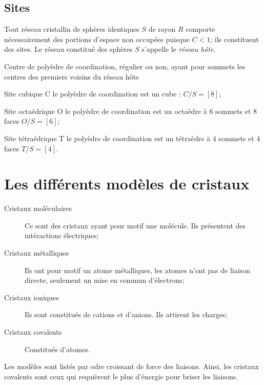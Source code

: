 \subsection{Sites}
Tout réseau cristallin de sphères identiques $S$ de rayon $R$ comporte
nécessairement des portions d'espace non occupées puisque $C < 1$; ils
constituent des sites. Le réseau constitué des sphères $S$ s'appelle le
\emph{réseau h\^ote}.
\begin{defi}
    Centre de polyèdre de coordination, régulier ou non, ayant pour sommets
    les centres des premiers voisins du réseau h\^ote
\end{defi}
\begin{ex}
    \begin{compactdesc}
        \item[Site cubique C] le polyèdre de coordination est un cube :
            $C/S = [8]$;
        \item[Site octaédrique O] le polyèdre de coordination est un
            octaèdre à 6 sommets et 8 faces $O/S = [6]$;
        \item[Site tétraédrique T] le polyèdre de coordination est un
            tétraèdre à 4 sommets et 4 faces $T/S = [4]$.
    \end{compactdesc}
\end{ex}


\section{Les différents modèles de cristaux}
\begin{description}
    \item[Cristaux moléculaires] Ce sont des cristaux ayant pour motif une
        molécule. Ils présentent des intéractions électriques;
    \item[Cristaux métalliques] Ils ont pour motif un atome métalliques, les
        atomes n'ont pas de liaison directe, seulement un mise en commun
        d'électrons;
    \item[Cristaux ioniques] Ils sont constitués de cations et d'anions. Ils
        attirent les charges;
    \item[Cristaux covalents] Constitués d'atomes.
\end{description}
Les modèles sont listés par odre croissant de force des liaisons. Ainsi, les
cristaux covalents sont ceux qui requièrent le plus d'énergie pour briser
les liaisons.


